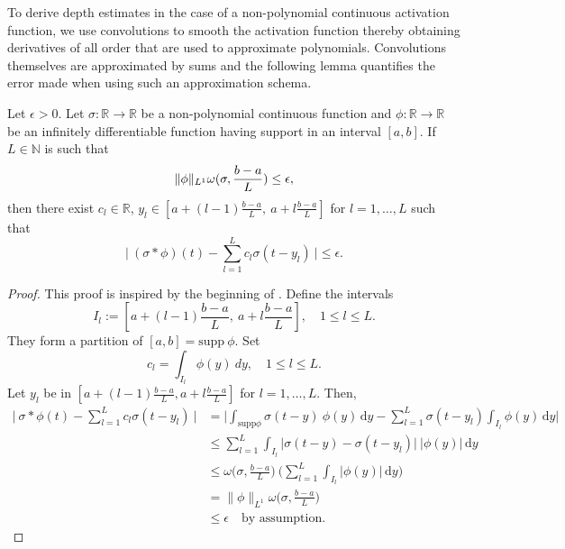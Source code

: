 \documentclass[anon,12pt]{colt2021} %
\begin{document}
To derive depth estimates in the case of a non-polynomial continuous activation function, we use convolutions to smooth the activation function thereby obtaining derivatives of all order that are used to approximate polynomials. Convolutions themselves are approximated by sums and the following lemma quantifies the error made when using such an approximation schema.

\begin{lemma} \label{errorconv}
Let $\epsilon >0$. Let $\sigma: \mathbb{R} \rightarrow \mathbb{R}$ be a non-polynomial continuous function and $\phi: \mathbb{R} \rightarrow \mathbb{R}$ be an infinitely differentiable function having support in an interval $[a, b]$. If $L \in \mathbb{N}$ is such that
\begin{equation*}
    \| \phi \| _{\footnotesize L^{1}} \omega(\sigma, \frac{b-a}{L}) \leq \epsilon,
\end{equation*}
then there exist $c_{l} \in \mathbb{R}$, $y_{l} \in [a+(l-1)\frac{b-a}{L}, \ a+l \frac{b-a}{L}]$ for $l=1, \dots, L$ such that
\begin{equation*}
    \big \vert \ (\sigma * \phi) (t) - \sum_{l=1}^{L} c_{l} \sigma(t- y_{l}) \ \big \vert \leq \epsilon.
\end{equation*}
\end{lemma}

\begin{proof}
This proof is inspired by the beginning of \citep[Chapter 24]{Cheney}. Define the intervals
\begin{equation*}
    I_{l} := \left[ a+(l-1)\frac{b-a}{L}, \ a+l \frac{b-a}{L} \right], \quad 1 \leq l \leq L.
\end{equation*}
They form a partition of $[a,b]=\text{supp} \ \phi$. Set
\begin{equation} \label{coeffRiemann}
    c_{l} = \int_{I_{l}} \phi(y) \ dy, \quad 1 \leq l \leq L.
\end{equation}
Let $y_{l}$ be in $[a+(l-1)\frac{b-a}{L}, a+l \frac{b-a}{L}]$ for $l=1, \dots, L$. Then,
\begin{align*}
    \big \vert \ \sigma * \phi (t) - \sum_{l=1}^{L} c_{l} \sigma(t-y_{l}) \ \big \vert &= \bigg \vert \int_{\text{supp} \phi} \sigma(t-y) \ \phi(y) \, \mathrm{d}y - \sum_{l=1}^{L} \sigma(t-y_{l}) \int_{I_{l}} \phi(y) \, \mathrm{d}y \bigg \vert \\
    & \leq \sum_{l=1}^{L} \int_{I_{l}} \vert \sigma(t-y) - \sigma(t-y_{l})\vert \ \vert \phi(y) \vert \, \mathrm{d}y \\
    & \leq \omega \big(\sigma, \frac{b-a}{L} \big) \ \bigg( \sum_{l=1}^{L} \int_{I_{l}} \vert \phi(y) \vert \, \mathrm{d}y \bigg) \\
    &= \| \phi \|_{L^{1}} \omega \big(\sigma, \frac{b-a}{L} \big) \\
    & \leq \epsilon \quad \text{by assumption.}
\end{align*}
\end{proof}
\end{document}
